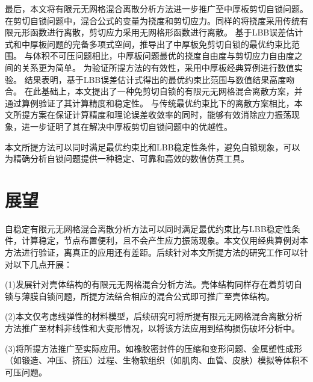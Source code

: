 最后，本文将有限元无网格混合离散分析方法进一步推广至中厚板剪切自锁问题。
在剪切自锁问题中，混合公式的变量为挠度和剪切应力。同样的将挠度采用传统有限元形函数进行离散，剪切应力采用无网格形函数进行离散。
基于LBB误差估计式和中厚板问题的完备多项式空间，推导出了中厚板免剪切自锁的最优约束比范围。
与体积不可压问题相比，中厚板问题最优的挠度自由度与剪切应力自由度之间的关系更为简单。
为验证所提方法的有效性，采用中厚板经典算例进行数值实验。
结果表明，基于LBB误差估计式得出的最优约束比范围与数值结果高度吻合。
在此基础上，本文提出了一种免剪切自锁的有限元无网格混合离散方案，并通过算例验证了其计算精度和稳定性。
与传统最优约束比下的离散方案相比，本文所提方案在保证计算精度和理论误差收敛率的同时，能够有效消除应力振荡现象，进一步证明了其在解决中厚板剪切自锁问题中的优越性。

本文所提方法可以同时满足最优约束比和LBB稳定性条件，避免自锁现象，可以为精确分析自锁问题提供一种稳定、可靠和高效的数值仿真工具。

\section{展望}
自稳定有限元无网格混合离散分析方法可以同时满足最优约束比与LBB稳定性条件，计算稳定，节点布置便利，且不会产生应力振荡现象。本文仅用经典算例对本方法进行验证，离真正的应用还有差距。后续针对本文所提方法的研究工作可以针对以下几点开展：

(1)发展针对壳体结构的有限元无网格混合分析方法。壳体结构同样存在着剪切自锁与薄膜自锁问题，所提方法结合相应的混合公式即可推广至壳体结构。

(2)本文仅考虑线弹性的材料模型，后续研究可将所提有限元无网格混合离散分析方法推广至材料非线性和大变形情况，以将该方法应用到结构损伤破坏分析中。

(3)将所提方法推广至实际应用。如橡胶密封件的压缩和变形问题、金属塑性成形（如锻造、冲压、挤压）过程、生物软组织（如肌肉、血管、皮肤）模拟等体积不可压问题。